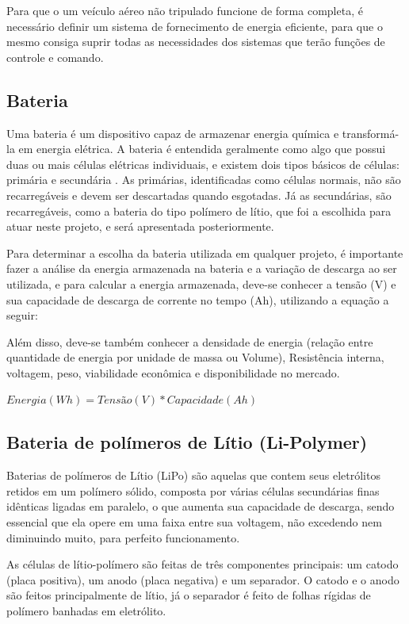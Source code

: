 
Para que o um veículo aéreo não tripulado funcione de forma completa, é necessário definir um sistema de fornecimento de energia eficiente, para que o mesmo consiga suprir todas as necessidades dos sistemas que terão funções de controle e comando.

\subsection{Bateria}

Uma bateria é um dispositivo capaz de armazenar energia química e transformá-la em energia elétrica. A bateria é entendida geralmente como algo que possui duas ou mais células elétricas individuais, e existem dois tipos básicos de células: primária e secundária \cite{gibbs}. As primárias, identificadas como células normais, não são recarregáveis e devem ser descartadas quando esgotadas. Já as secundárias, são recarregáveis, como a bateria do tipo polímero de lítio, que foi a escolhida para atuar neste projeto, e será apresentada posteriormente. 

Para determinar a escolha da bateria utilizada em qualquer projeto, é importante fazer a análise  da energia armazenada na bateria e a variação de descarga ao ser utilizada, e para calcular a energia armazenada, deve-se conhecer a tensão (V) e sua capacidade de descarga de corrente no tempo (Ah), utilizando a equação a seguir: \cite{peixoto}

Além disso, deve-se também conhecer a densidade de energia (relação entre quantidade de energia por unidade de massa ou Volume), Resistência interna, voltagem, peso, viabilidade econômica e disponibilidade no mercado.

$Energia(Wh)= Tensão(V)*Capacidade(Ah)$

\subsection{Bateria de polímeros de Lítio (Li-Polymer)}

Baterias de polímeros de Lítio (LiPo) são aquelas que contem seus eletrólitos retidos em um polímero sólido, 
composta por várias células secundárias finas idênticas ligadas em paralelo, o que aumenta sua capacidade de 
descarga, sendo essencial que ela opere em uma faixa entre sua voltagem, não excedendo nem diminuindo muito, para perfeito funcionamento. \cite{gibbs}

As células de lítio-polímero são feitas de três componentes principais: um catodo (placa positiva), um anodo 
(placa negativa) e um separador. O catodo e o anodo são feitos principalmente de lítio, já o separador é feito 
de folhas rígidas de polímero banhadas em eletrólito. \cite{gibbs}

